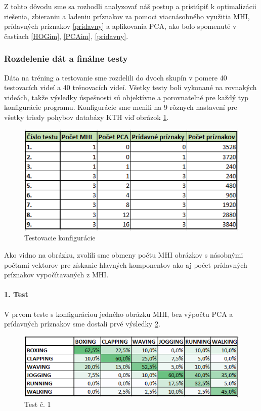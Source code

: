 Z tohto dôvodu sme sa rozhodli analyzovať náš postup a pristúpiť k optimalizácii riešenia, zbieraniu a ladeniu príznakov za pomoci viacnásobného využitia MHI, prídavných príznakov \ref{pridavny} a aplikovania PCA, ako bolo spomenuté v častiach \ref{HOGim}, \ref{PCAim}, \ref{pridavny}.


\subsubsection{Rozdelenie dát a finálne testy}
Dáta na tréning a testovanie sme rozdelili do dvoch skupín v pomere 40 testovacích videí a 40 trénovacích videí. Všetky testy boli vykonané na rovnakých videách, takže výsledky úspešnosti sú objektívne a porovnateľné pre každý typ konfigurácie programu.
Konfigurácie sme menili na 9 rôznych nastavení pre všetky triedy pohybov databázy KTH viď obrázok \ref{tabTesty}.

\begin{figure}[H]
  \centering
  \includegraphics[width=14cm]{img/tabTesty.png}
  \caption{Testovacie konfigurácie}
  \label{tabTesty}
\end{figure} 

Ako vidno na obrázku, zvolili sme obmeny počtu MHI obrázkov s násobnými počtami vektorov pre získanie hlavných komponentov ako aj počet prídavných príznakov vypočítavaných z MHI. 

\paragraph{1. Test} 
V prvom teste s konfiguráciou jedného obrázku MHI, bez výpočtu PCA a prídavných príznakov sme dostali prvé výsledky \ref{test1}.

\begin{figure}[H]
  \centering
  \includegraphics[width=14cm]{img/test6classes1g.png}
  \caption{Test č. 1}
  \label{test1}
\end{figure} 

